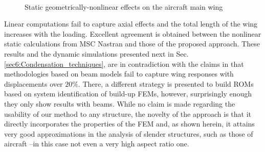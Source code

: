 \documentclass[11pt]{article}
\begin{document}
\begin{figure}[h!]
 \centering
  \\
\caption{Static geometrically-nonlinear effects on the aircraft main wing}\label{fig:sp_axial}
\end{figure}
Linear computations fail to capture axial effects and the total length of the wing increases with the loading. Excellent agreement is obtained between the nonlinear static calculations from MSC Nastran and those of the proposed approach. These results and the dynamic simulations presented next in Sec. \ref{sec6:Condensation_techniques}, are in contradiction with the claims in \cite{Medeiros2019} that methodologies based on beam models fail to capture wing responses with displacements over $20\%$. There, a different strategy is presented to build ROMs based on system identification of build-up FEMs, however, surprisingly enough they only show results with beams. While no claim is made regarding the usability of our method to any structure, the novelty of the approach is that it directly incorporates the properties of the FEM and, as shown herein, it attains very good approximations in the analysis  of slender structures,  such as those of aircraft --in this case  not even a very high aspect ratio one. 
\end{document}
